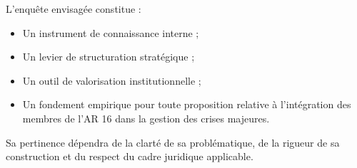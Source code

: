 \documentclass[12pt,a4paper]{article}
\begin{document}
L'enquête envisagée constitue :

\begin{itemize}
    \item Un instrument de connaissance interne ;
    \item Un levier de structuration stratégique ;
    \item Un outil de valorisation institutionnelle ;
    \item Un fondement empirique pour toute proposition relative à l'intégration des membres de l'AR 16 dans la gestion des crises majeures.
\end{itemize}

Sa pertinence dépendra de la clarté de sa problématique, de la rigueur de sa construction et du respect du cadre juridique applicable.

\newpage

\printbibliography[heading=bibintoc,title={Références bibliographiques}]

\nocite{*}

\end{document}
